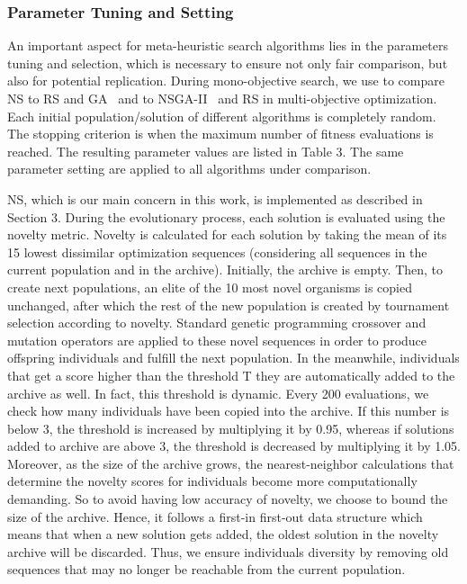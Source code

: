\subsubsection{Parameter Tuning and Setting}
An important aspect for meta-heuristic search algorithms lies in the parameters tuning and selection, which is necessary to ensure not only fair comparison, but also for potential replication. 
During mono-objective search, we use to compare NS to RS and GA~\cite{cooper2002adaptive} and to NSGA-II~\cite{deb2002fast} and RS in multi-objective optimization. Each initial population/solution of different algorithms is completely random. The stopping criterion is when the maximum number of fitness evaluations is reached.
The resulting parameter values are listed in Table 3. The same parameter setting are applied to all algorithms under comparison.

NS, which is our main concern in this work, is implemented as described in Section 3. During the evolutionary process, each solution is evaluated using the novelty metric. Novelty is calculated for each solution by taking the mean of its 15 lowest dissimilar optimization sequences (considering all sequences in the current population and in the archive). Initially, the archive is empty. 
Then, to create next populations, an elite of the 10 most novel organisms is copied unchanged, after which the rest of the new population is created by tournament selection according to novelty. Standard genetic programming crossover and mutation operators are applied to these novel sequences in order to produce offspring individuals and fulfill the next population.
In the meanwhile, individuals that get a score higher than the threshold T they are automatically added to the archive as well. 
In fact, this threshold is dynamic. Every 200 evaluations, we check how many individuals have been copied into the archive. If this number is below 3, the threshold is increased by multiplying it by 0.95, whereas if solutions added to archive are above 3, the threshold is decreased by multiplying it by 1.05. 
Moreover, as the size of the archive grows, the nearest-neighbor calculations that determine the novelty scores for individuals become more computationally demanding. So to avoid having low accuracy of novelty, we choose to bound the size of the archive. Hence, it follows a first-in first-out data structure which means that when a new solution gets added, the oldest solution in the novelty archive will be discarded. Thus, we ensure individuals diversity by removing old sequences that may no longer be reachable from the current population.

